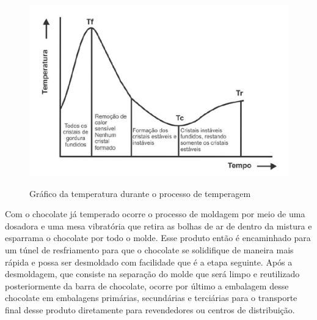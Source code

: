 \documentclass[
	12pt,				%
	openright,			%
	oneside,			%
	a4paper,			%
	english,			%
	french,				%
	spanish,			%
	brazil				%
	]{abntex2}
\begin{document}
\begin{figure}[H]
\begin{center}
\caption{Gráfico da temperatura durante o processo de temperagem}
\includegraphics[scale=0.7]{../../Pictures/graficotemperagem.png} 
\label{figtemp}
\end{center}
\end{figure}

Com o chocolate já temperado ocorre o processo de moldagem por meio de uma dosadora e uma mesa vibratória que retira as bolhas de ar de dentro da mistura e esparrama o chocolate por todo o molde. Esse produto então é encaminhado para um túnel de resfriamento para que o chocolate se solidifique de maneira mais rápida e possa ser desmoldado com facilidade que é a etapa seguinte. Após a desmoldagem, que consiste na separação do molde que será limpo e reutilizado posteriormente da barra de chocolate, ocorre por último a embalagem desse chocolate em embalagens primárias, secundárias e terciárias para o transporte final desse produto diretamente para revendedores ou centros de distribuição.
\end{document}
